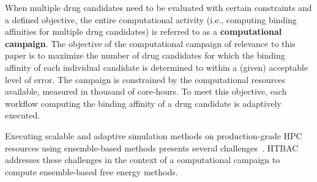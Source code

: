 When multiple drug candidates need to be evaluated with certain constraints
and a defined objective, the entire computational activity (i.e., computing
binding affinities for multiple drug candidates) is referred to as a
\textbf{computational campaign}. The objective of the computational campaign
of relevance to this paper is to maximize the number of drug candidates for
which the binding affinity of each individual candidate is determined to
within a (given) acceptable level of error. The campaign is constrained by
the computational resources available, measured in thousand of core-hours. To
meet this objective, each workflow computing the binding affinity of a drug
candidate is adaptively executed.

Executing scalable and adaptive simulation methods on production-grade HPC
resources using ensemble-based methods presents several
challenges~\cite{cosb18,adaptivebiomolecular}. HTBAC addresses these
challenges in the context of a computational campaign to compute
ensemble-based free energy methods.